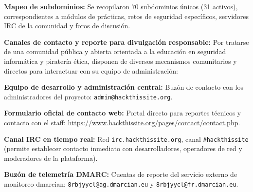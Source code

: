\begin{itemizeColor}
    \item \textbf{Mapeo de subdominios:}
    Se recopilaron 70 subdominios únicos (31 activos), correspondientes a módulos de prácticas, retos de seguridad específicos, servidores IRC de la comunidad y foros de discusión.

    \item \textbf{Canales de contacto y reporte para divulgación responsable:}
    Por tratarse de una comunidad pública y abierta orientada a la educación en seguridad informática y piratería ética, disponen de diversos mecanismos comunitarios y directos para interactuar con su equipo de administración:
    \begin{itemizeColor}
        \item \textbf{Equipo de desarrollo y administración central:} Buzón de contacto con los administradores del proyecto: \texttt{admin@hackthissite.org}.
        \item \textbf{Formulario oficial de contacto web:} Portal directo para reportes técnicos y contacto con el staff: \url{https://www.hackthissite.org/pages/contact/contact.php}.
        \item \textbf{Canal IRC en tiempo real:} Red \texttt{irc.hackthissite.org}, canal \texttt{\#hackthissite} (permite establecer contacto inmediato con desarrolladores, operadores de red y moderadores de la plataforma).
        \item \textbf{Buzón de telemetría DMARC:} Cuentas de reporte del servicio externo de monitoreo dmarcian: \texttt{8rbjyycl@ag.dmarcian.eu} y \texttt{8rbjyycl@fr.dmarcian.eu}.
    \end{itemizeColor}
\end{itemizeColor}
